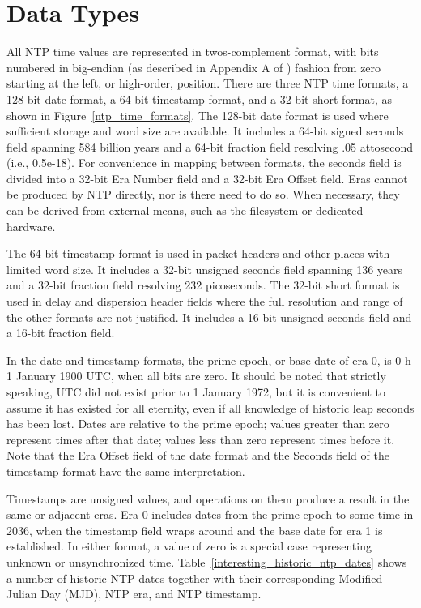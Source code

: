 \chapter{Data Types}
\label{section-6}

All NTP time values are represented in twos-complement format, with
bits numbered in big-endian (as described in Appendix A of \cite{RFC0791})
fashion from zero starting at the left, or high-order, position.
There are three NTP time formats, a 128-bit date format, a 64-bit
timestamp format, and a 32-bit short format, as shown in Figure~\ref{ntp_time_formats}.
The 128-bit date format is used where sufficient storage and word
size are available. It includes a 64-bit signed seconds field
spanning 584 billion years and a 64-bit fraction field resolving .05
attosecond (i.e., 0.5e-18). For convenience in mapping between
formats, the seconds field is divided into a 32-bit Era Number field
and a 32-bit Era Offset field. Eras cannot be produced by NTP
directly, nor is there need to do so. When necessary, they can be
derived from external means, such as the filesystem or dedicated
hardware.


The 64-bit timestamp format is used in packet headers and other
places with limited word size. It includes a 32-bit unsigned seconds
field spanning 136 years and a 32-bit fraction field resolving 232
picoseconds. The 32-bit short format is used in delay and dispersion
header fields where the full resolution and range of the other
formats are not justified. It includes a 16-bit unsigned seconds
field and a 16-bit fraction field.

In the date and timestamp formats, the prime epoch, or base date of
era 0, is 0 h 1 January 1900 UTC, when all bits are zero. It should
be noted that strictly speaking, UTC did not exist prior to 1 January
1972, but it is convenient to assume it has existed for all eternity,
even if all knowledge of historic leap seconds has been lost. Dates
are relative to the prime epoch; values greater than zero represent
times after that date; values less than zero represent times before
it. Note that the Era Offset field of the date format and the
Seconds field of the timestamp format have the same interpretation.

Timestamps are unsigned values, and operations on them produce a
result in the same or adjacent eras. Era 0 includes dates from the
prime epoch to some time in 2036, when the timestamp field wraps
around and the base date for era 1 is established. In either format,
a value of zero is a special case representing unknown or
unsynchronized time. Table~\ref{interesting_historic_ntp_dates} shows a number of historic NTP dates
together with their corresponding Modified Julian Day (MJD), NTP era,
and NTP timestamp.

